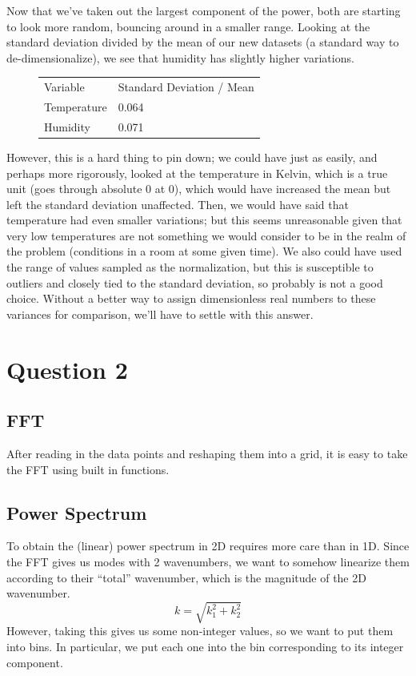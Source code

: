 \documentclass{article}
\begin{document}
Now that we've taken out the largest component of the power, both are starting to look more random, bouncing around in a smaller range. Looking at the standard deviation divided by the mean of our new datasets (a standard way to de-dimensionalize), we see that humidity has slightly higher variations.

\begin{figure}[H]
\begin{tabular}{l l}
Variable & Standard Deviation / Mean\\
Temperature & 0.064\\
Humidity & 0.071\\
\end{tabular}
\end{figure}

However, this is a hard thing to pin down; we could have just as easily, and perhaps more rigorously, looked at the temperature in Kelvin, which is a true unit (goes through absolute 0 at 0), which would have increased the mean but left the standard deviation unaffected. Then, we would have said that temperature had even smaller variations; but this seems unreasonable given that very low temperatures are not something we would consider to be in the realm of the problem (conditions in a room at some given time). We also could have used the range of values sampled as the normalization, but this is susceptible to outliers and closely tied to the standard deviation, so probably is not a good choice. Without a better way to assign dimensionless real numbers to these variances for comparison, we'll have to settle with this answer.

\section{Question 2}
\subsection{FFT}
After reading in the data points and reshaping them into a grid, it is easy to take the FFT using built in functions.
\subsection{Power Spectrum}
To obtain the (linear) power spectrum in 2D requires more care than in 1D. Since the FFT gives us modes with 2 wavenumbers, we want to somehow linearize them according to their ``total'' wavenumber, which is the magnitude of the 2D wavenumber.
$$k = \sqrt{k_1^2 + k_2^2}$$
However, taking this gives us some non-integer values, so we want to put them into bins. In particular, we put each one into the bin corresponding to its integer component.
\end{document}
